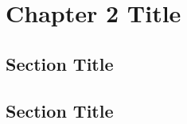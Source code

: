 \documentclass[../main.tex]{subfiles}
\begin{document}
\newpage
\onehalfspacing
\RaggedRight
\setcounter{chapter}{1}
\thesischapterstyle

\chapter{Chapter 2 Title}\label{chap2:short-label}

\section{Section Title}
\lipsum[1]

\section{Section Title}
\lipsum[2]
\end{document}
